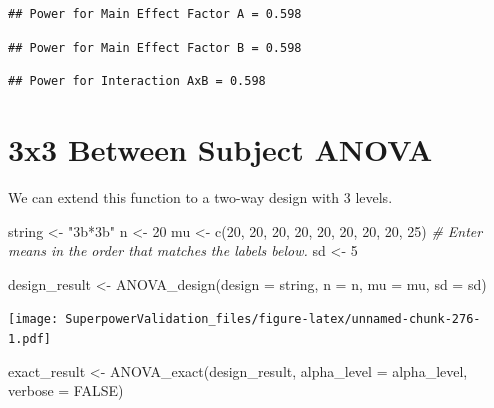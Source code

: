 \documentclass[
]{book}
\newenvironment{Shaded}{\begin{snugshade}}{\end{snugshade}}
\newcommand{\AttributeTok}[1]{\textcolor[rgb]{0.77,0.63,0.00}{#1}}
\newcommand{\CommentTok}[1]{\textcolor[rgb]{0.56,0.35,0.01}{\textit{#1}}}
\newcommand{\ConstantTok}[1]{\textcolor[rgb]{0.00,0.00,0.00}{#1}}
\newcommand{\DecValTok}[1]{\textcolor[rgb]{0.00,0.00,0.81}{#1}}
\newcommand{\FunctionTok}[1]{\textcolor[rgb]{0.00,0.00,0.00}{#1}}
\newcommand{\NormalTok}[1]{#1}
\newcommand{\OtherTok}[1]{\textcolor[rgb]{0.56,0.35,0.01}{#1}}
\newcommand{\StringTok}[1]{\textcolor[rgb]{0.31,0.60,0.02}{#1}}
\begin{document}
\begin{verbatim}
## Power for Main Effect Factor A = 0.598
\end{verbatim}

\begin{verbatim}
## Power for Main Effect Factor B = 0.598
\end{verbatim}

\begin{verbatim}
## Power for Interaction AxB = 0.598
\end{verbatim}

\hypertarget{x3-between-subject-anova}{%
\section{3x3 Between Subject ANOVA}\label{x3-between-subject-anova}}

We can extend this function to a two-way design with 3 levels.

\begin{Shaded}
\begin{Highlighting}[]
\NormalTok{string }\OtherTok{\textless{}{-}} \StringTok{"3b*3b"}
\NormalTok{n }\OtherTok{\textless{}{-}} \DecValTok{20}
\NormalTok{mu }\OtherTok{\textless{}{-}} \FunctionTok{c}\NormalTok{(}\DecValTok{20}\NormalTok{, }\DecValTok{20}\NormalTok{, }\DecValTok{20}\NormalTok{, }\DecValTok{20}\NormalTok{, }\DecValTok{20}\NormalTok{, }\DecValTok{20}\NormalTok{, }\DecValTok{20}\NormalTok{, }\DecValTok{20}\NormalTok{, }\DecValTok{25}\NormalTok{) }
\CommentTok{\# Enter means in the order that matches the labels below.}
\NormalTok{sd }\OtherTok{\textless{}{-}} \DecValTok{5}

\NormalTok{design\_result }\OtherTok{\textless{}{-}} \FunctionTok{ANOVA\_design}\NormalTok{(}\AttributeTok{design =}\NormalTok{ string,}
                   \AttributeTok{n =}\NormalTok{ n, }
                   \AttributeTok{mu =}\NormalTok{ mu, }
                   \AttributeTok{sd =}\NormalTok{ sd)}
\end{Highlighting}
\end{Shaded}

\texttt{[image: SuperpowerValidation\_files/figure-latex/unnamed-chunk-276-1.pdf]}

\begin{Shaded}
\begin{Highlighting}[]
\NormalTok{exact\_result }\OtherTok{\textless{}{-}} \FunctionTok{ANOVA\_exact}\NormalTok{(design\_result,}
                            \AttributeTok{alpha\_level =}\NormalTok{ alpha\_level,}
                            \AttributeTok{verbose =} \ConstantTok{FALSE}\NormalTok{)}
\end{Highlighting}
\end{Shaded}
\end{document}

